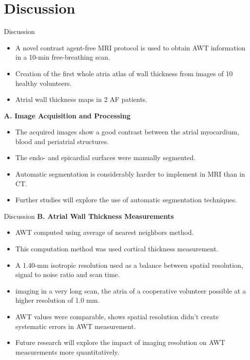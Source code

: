 \documentclass[aspectratio=43]{beamer}
\begin{document}
\section{Discussion}
\begin{frame}{Discussion}
\begin{itemize}
\item A novel contrast agent-free MRI protocol is used to obtain AWT information in a 10-min free-breathing scan.
\item Creation of the first whole atria atlas of wall thickness from images of 10 healthy volunteers.
\item Atrial wall thickness maps in 2 AF patients.

\end{itemize}
\textbf{A. Image Acquisition and Processing}
\begin{itemize}
\item The acquired images show a good contrast between the atrial myocardium, blood and periatrial structures.
\item The endo- and epicardial surfaces were manually segmented.
\item Automatic segmentation is considerably harder to implement in MRI than in CT.
\item Further studies will explore the use of automatic segmentation techniques.
\end{itemize}
\end{frame}
\begin{frame}{Discussion}
\textbf{B. Atrial Wall Thickness Measurements}
\begin{itemize}
\item AWT computed using average of nearest neighbors method.
\item This computation method was used cortical thickness measurement.
\item A 1.40-mm isotropic resolution used as a balance between spatial resolution, signal to noise ratio and scan time.
\item imaging in a very long scan, the atria of a cooperative volunteer possible at a higher resolution of 1.0 mm.
\item AWT values were comparable, shows spatial resolution didn't create systematic errors in AWT measurement.
\item Future research will explore the impact of imaging resolution on AWT measurements more quantitatively. 
\end{itemize}
\end{frame}
\end{document}
